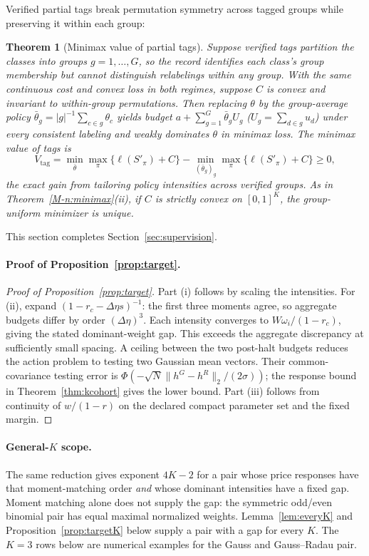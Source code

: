 \documentclass[12pt]{article}
\newtheorem{theorem}{Theorem}[section]
\theoremstyle{definition}
\theoremstyle{remark}
\begin{document}
Verified partial tags break permutation symmetry across tagged groups while preserving it within each group:

\begin{theorem}[Minimax value of partial tags]\label{n:minimaxtags}
Suppose verified tags partition the classes into groups $g = 1, \dots, G$, so the record identifies each class's group membership but cannot distinguish relabelings within any group. With the same continuous cost and convex loss in both regimes, suppose $C$ is convex and invariant to within-group permutations. Then replacing $\theta$ by the group-average policy $\bar{\theta}_g = |g|^{-1} \sum_{c \in g} \theta_c$ yields budget $a + \sum_{g=1}^G \bar{\theta}_g U_g$ ($U_g = \sum_{d \in g} u_d$) under every consistent labeling and weakly dominates $\theta$ in minimax loss. The minimax value of tags is
\[
  V_{\mathrm{tag}} = \min_{\bar{\theta}} \max_{\pi} \{\ell(S'_\pi) + C\} - \min_{(\bar{\theta}_g)_g} \max_{\pi} \{\ell(S'_\pi) + C\} \ge 0,
\]
the exact gain from tailoring policy intensities across verified groups. As in Theorem~\ref{M-n:minimax}(ii), if $C$ is strictly convex on $[0, 1]^K$, the group-uniform minimizer is unique.
\end{theorem}


This section completes Section~\ref{sec:supervision}.

\paragraph{Proof of Proposition~\ref{prop:target}.}
\begin{proof}[Proof of Proposition~\ref{prop:target}]
Part (i) follows by scaling the intensities. For (ii), expand $(1-r_c-\Delta\eta s)^{-1}$: the first three moments agree, so aggregate budgets differ by order $(\Delta\eta)^3$. Each intensity converges to $W\omega_i/(1-r_c)$, giving the stated dominant-weight gap. This exceeds the aggregate discrepancy at sufficiently small spacing. A ceiling between the two post-halt budgets reduces the action problem to testing two Gaussian mean vectors. Their common-covariance testing error is $\Phi(-\sqrt N\|h^G-h^R\|_2/(2\sigma))$; the response bound in Theorem~\ref{thm:kcohort} gives the lower bound. Part (iii) follows from continuity of $w/(1-r)$ on the declared compact parameter set and the fixed margin.
\end{proof}

\paragraph{General-$K$ scope.} The same reduction gives exponent $4K-2$ for a pair whose price responses have that moment-matching order \emph{and} whose dominant intensities have a fixed gap. Moment matching alone does not supply the gap: the symmetric odd/even binomial pair has equal maximal normalized weights. Lemma~\ref{lem:everyK} and Proposition~\ref{prop:targetK} below supply a pair with a gap for every $K$. The $K=3$ rows below are numerical examples for the Gauss and Gauss--Radau pair.
\end{document}

